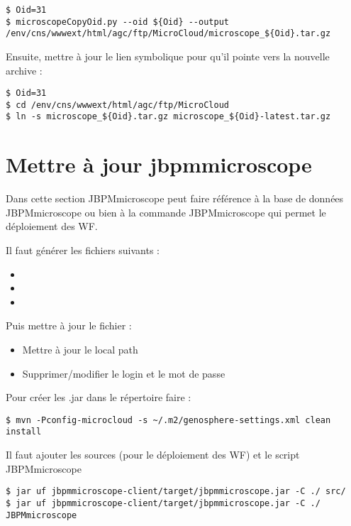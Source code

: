 \begin{lstlisting}[style=bash]
$ Oid=31
$ microscopeCopyOid.py --oid ${Oid} --output /env/cns/wwwext/html/agc/ftp/MicroCloud/microscope_${Oid}.tar.gz
\end{lstlisting}

Ensuite, mettre à jour le lien symbolique pour qu'il pointe vers la nouvelle archive :
\begin{lstlisting}[style=bash]
$ Oid=31
$ cd /env/cns/wwwext/html/agc/ftp/MicroCloud
$ ln -s microscope_${Oid}.tar.gz microscope_${Oid}-latest.tar.gz
\end{lstlisting}

\section{Mettre à jour jbpmmicroscope}

Dans cette section JBPMmicroscope peut faire référence à la base de données JBPMmicroscope ou bien à la commande JBPMmicroscope qui permet le déploiement des WF.
\newline

Il faut générer les fichiers suivants :
\begin{itemize}
	\item {}
	\item {}
	\item {}
\end{itemize}
\bigskip

Puis mettre à jour le fichier  :
\begin{itemize}
	\item  Mettre à jour le local path
	\item Supprimer/modifier le login et le mot de passe
\end{itemize}

Pour créer les .jar dans le répertoire  faire :

\begin{lstlisting}[style=bash]
$ mvn -Pconfig-microcloud -s ~/.m2/genosphere-settings.xml clean install
\end{lstlisting}
\bigskip

Il faut ajouter les sources (pour le déploiement des WF) et le script JBPMmicroscope
\begin{lstlisting}[style=bash]
$ jar uf jbpmmicroscope-client/target/jbpmmicroscope.jar -C ./ src/
$ jar uf jbpmmicroscope-client/target/jbpmmicroscope.jar -C ./ JBPMmicroscope
\end{lstlisting}
\bigskip

